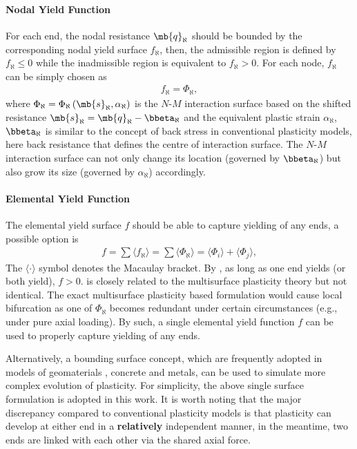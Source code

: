 \paragraph{Nodal Yield Function}
For each end, the nodal resistance $\mb{q}_\aleph$ should be bounded by the corresponding nodal yield surface $f_\aleph$, then, the admissible region is defined by $f_\aleph\leqslant0$ while the inadmissible region is equivalent to $f_\aleph>0$. For each node, $f_\aleph$ can be simply chosen as
\begin{gather}
f_\aleph=\Phi_\aleph,
\end{gather}
where $\Phi_\aleph=\Phi_\aleph\left(\mb{s}_\aleph,\alpha_\aleph\right)$ is the $N$-$M$ interaction surface based on the shifted resistance $\mb{s}_\aleph=\mb{q}_\aleph-\bbeta_\aleph$ and the equivalent plastic strain $\alpha_\aleph$, $\bbeta_\aleph$ is similar to the concept of back stress in conventional plasticity models, here back resistance that defines the centre of interaction surface. The $N$-$M$ interaction surface can not only change its location (governed by $\bbeta_\aleph$) but also grow its size (governed by $\alpha_\aleph$) accordingly.
\paragraph{Elemental Yield Function}
The elemental yield surface $f$ should be able to capture yielding of any ends, a possible option is
\begin{gather}\label{eq:nm_yield}
f=\sum{}\langle{}f_\aleph\rangle=\sum\langle\Phi_\aleph\rangle=\langle\Phi_i\rangle+\langle\Phi_j\rangle,
\end{gather}
The $\langle\cdot\rangle$ symbol denotes the Macaulay bracket. By , as long as one end yields (or both yield), $f>0$.  is closely related to the multisurface plasticity theory \cite{Simo1998} but not identical. The exact multisurface plasticity based formulation \cite{Kostic2013} would cause local bifurcation as one of $\Phi_\aleph$ becomes redundant under certain circumstances (e.g., under pure axial loading). By such, a single elemental yield function $f$ can be used to properly capture yielding of any ends.

Alternatively, a bounding surface concept, which are frequently adopted in models of geomaterials \cite{Dafalias2004}, concrete and metals, can be used to simulate more complex evolution of plasticity. For simplicity, the above single surface formulation is adopted in this work. It is worth noting that the major discrepancy compared to conventional plasticity models is that plasticity can develop at either end in a \textbf{relatively} independent manner, in the meantime, two ends are linked with each other via the shared axial force.

